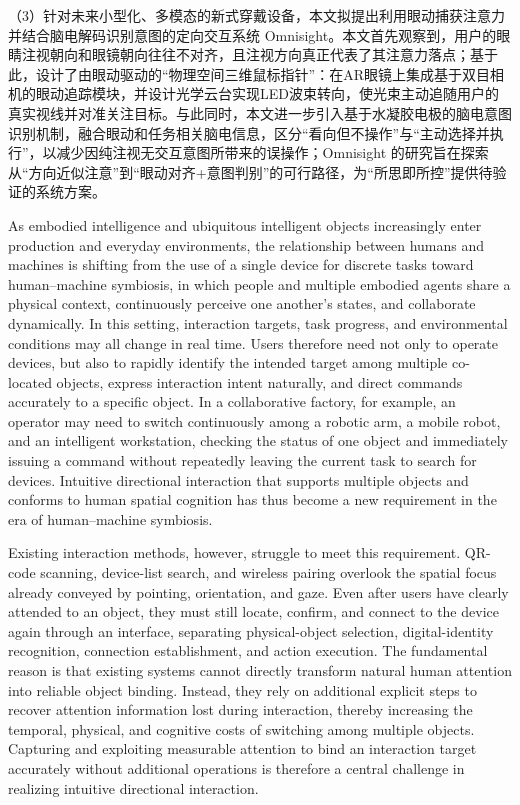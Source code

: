 \begin{cabstract}
（3）针对未来小型化、多模态的新式穿戴设备，本文拟提出利用眼动捕获注意力并结合脑电解码识别意图的定向交互系统 Omnisight。本文首先观察到，用户的眼睛注视朝向和眼镜朝向往往不对齐，且注视方向真正代表了其注意力落点；基于此，设计了由眼动驱动的“物理空间三维鼠标指针”：在AR眼镜上集成基于双目相机的眼动追踪模块，并设计光学云台实现LED波束转向，使光束主动追随用户的真实视线并对准关注目标。与此同时，本文进一步引入基于水凝胶电极的脑电意图识别机制，融合眼动和任务相关脑电信息，区分“看向但不操作”与“主动选择并执行”，以减少因纯注视无交互意图所带来的误操作；Omnisight 的研究旨在探索从“方向近似注意”到“眼动对齐+意图判别”的可行路径，为“所思即所控”提供待验证的系统方案。

\end{cabstract}

\begin{eabstract}
As embodied intelligence and ubiquitous intelligent objects increasingly enter production and everyday environments, the relationship between humans and machines is shifting from the use of a single device for discrete tasks toward human--machine symbiosis, in which people and multiple embodied agents share a physical context, continuously perceive one another's states, and collaborate dynamically. In this setting, interaction targets, task progress, and environmental conditions may all change in real time. Users therefore need not only to operate devices, but also to rapidly identify the intended target among multiple co-located objects, express interaction intent naturally, and direct commands accurately to a specific object. In a collaborative factory, for example, an operator may need to switch continuously among a robotic arm, a mobile robot, and an intelligent workstation, checking the status of one object and immediately issuing a command without repeatedly leaving the current task to search for devices. Intuitive directional interaction that supports multiple objects and conforms to human spatial cognition has thus become a new requirement in the era of human--machine symbiosis.

Existing interaction methods, however, struggle to meet this requirement. QR-code scanning, device-list search, and wireless pairing overlook the spatial focus already conveyed by pointing, orientation, and gaze. Even after users have clearly attended to an object, they must still locate, confirm, and connect to the device again through an interface, separating physical-object selection, digital-identity recognition, connection establishment, and action execution. The fundamental reason is that existing systems cannot directly transform natural human attention into reliable object binding. Instead, they rely on additional explicit steps to recover attention information lost during interaction, thereby increasing the temporal, physical, and cognitive costs of switching among multiple objects. Capturing and exploiting measurable attention to bind an interaction target accurately without additional operations is therefore a central challenge in realizing intuitive directional interaction.


\end{eabstract}
